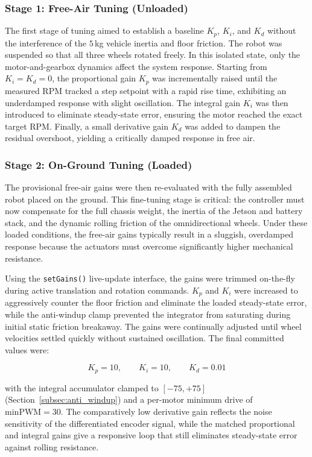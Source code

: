 \subsubsection{Stage 1: Free-Air Tuning (Unloaded)}
The first stage of tuning aimed to establish a baseline $K_p$, $K_i$, and $K_d$ without the interference of the $5$\,kg vehicle inertia and floor friction. The robot was suspended so that all three wheels rotated freely. In this isolated state, only the motor-and-gearbox dynamics affect the system response. Starting from $K_i = K_d = 0$, the proportional gain $K_p$ was incrementally raised until the measured RPM tracked a step setpoint with a rapid rise time, exhibiting an underdamped response with slight oscillation. The integral gain $K_i$ was then introduced to eliminate steady-state error, ensuring the motor reached the exact target RPM. Finally, a small derivative gain $K_d$ was added to dampen the residual overshoot, yielding a critically damped response in free air.


\subsubsection{Stage 2: On-Ground Tuning (Loaded)}
The provisional free-air gains were then re-evaluated with the fully assembled robot placed on the ground. This fine-tuning stage is critical: the controller must now compensate for the full chassis weight, the inertia of the Jetson and battery stack, and the dynamic rolling friction of the omnidirectional wheels. Under these loaded conditions, the free-air gains typically result in a sluggish, overdamped response because the actuators must overcome significantly higher mechanical resistance.

Using the \texttt{setGains()} live-update interface, the gains were trimmed on-the-fly during active translation and rotation commands. $K_p$ and $K_i$ were increased to aggressively counter the floor friction and eliminate the loaded steady-state error, while the anti-windup clamp prevented the integrator from saturating during initial static friction breakaway. The gains were continually adjusted until wheel velocities settled quickly without sustained oscillation. The final committed values were:

\begin{equation}
    K_p = 10, \qquad K_i = 10, \qquad K_d = 0.01
    \label{eq:final_gains}
\end{equation}


with the integral accumulator clamped to $[-75, +75]$ (Section~\ref{subsec:anti_windup}) and a per-motor minimum drive of $\mathrm{minPWM} = 30$. The comparatively low derivative gain reflects the noise sensitivity of the differentiated encoder signal, while the matched proportional and integral gains give a responsive loop that still eliminates steady-state error against rolling resistance.
\newpage
